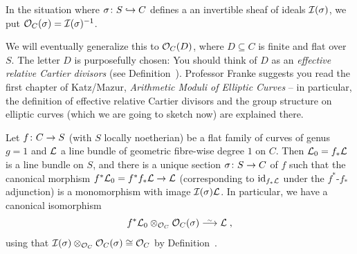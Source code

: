 \documentclass[a4paper,parskip=half,numbers=enddot, DIV=12]{scrreprt}
\begin{document}
\begin{defi}
	In the situation where $\sigma\colon S\monomorphism C$ defines a an invertible sheaf of ideals $\mathcal{I}(\sigma)$, we put $\mathcal{O}_C(\sigma)=\mathcal{I}(\sigma)^{-1}$.
\end{defi}
\begin{rem}
	We will eventually generalize this to $\mathcal{O}_C(D)$, where $D\subseteq C$ is finite and flat over $S$. The letter $D$ is purposefully chosen: You should think of $D$ as an \emph{effective relative Cartier divisors} (see Definition~). Professor Franke suggests you read the first chapter of Katz/Mazur, \emph{Arithmetic Moduli of Elliptic Curves} \cite{katzmazur} -- in particular, the definition of effective relative Cartier divisors and the group structure on elliptic curves (which we are going to sketch now) are explained there.
\end{rem}
\begin{prop}
	Let $f\colon C\morphism S$ (with $S$ locally noetherian) be a flat family of curves of genus $g=1$ and $\mathcal{L}$ a line bundle of geometric fibre-wise degree $1$ on $C$. Then $\mathcal{L}_0=f_*\mathcal{L}$ is a line bundle on $S$, and there is a unique section $\sigma\colon S\morphism C$ of $f$ such that the canonical morphism $f^*\Ll_0=f^*f_*\Ll\morphism\Ll$ (corresponding to $\operatorname{id}_{f_*\mathcal{L}}$ under the $f^*$-$f_*$ adjunction) is a monomorphism with image $\mathcal{I}(\sigma)\mathcal{L}$. In particular, we have a canonical isomorphism
	\begin{align*}
		f^*\Ll_0\otimes_{\Oo_C}\Oo_C(\sigma)\isomorphism\Ll\;,
	\end{align*}
	using that $\mathcal{I}(\sigma)\otimes_{\mathcal{O}_C}\mathcal{O}_C(\sigma)\cong \mathcal{O}_C$ by Definition~.
\end{prop}
\end{document}
